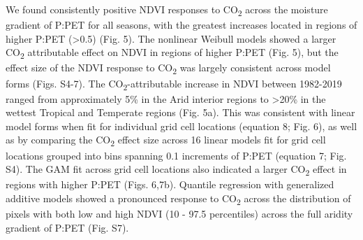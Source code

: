 \documentclass[gc, manuscript]{copernicus}
\begin{document}
We found consistently positive NDVI responses to CO\textsubscript{2}
across the moisture gradient of P:PET for all seasons, with the greatest
increases located in regions of higher P:PET (\textgreater0.5) (Fig. 5).
The nonlinear Weibull models showed a larger CO\textsubscript{2}
attributable effect on NDVI in regions of higher P:PET (Fig. 5), but the
effect size of the NDVI response to CO\textsubscript{2} was largely
consistent across model forms (Figs. S4-7). The
CO\textsubscript{2}-attributable increase in NDVI between 1982-2019
ranged from approximately 5\% in the Arid interior regions to
\textgreater20\% in the wettest Tropical and Temperate regions (Fig.
5a). This was consistent with linear model forms when fit for individual
grid cell locations (equation 8; Fig. 6), as well as by comparing the
CO\textsubscript{2} effect size across 16 linear models fit for grid
cell locations grouped into bins spanning 0.1 increments of P:PET
(equation 7; Fig. S4). The GAM fit across grid cell locations also
indicated a larger CO\textsubscript{2} effect in regions with higher
P:PET (Figs. 6,7b). Quantile regression with generalized additive models
showed a pronounced response to CO\textsubscript{2} across the
distribution of pixels with both low and high NDVI (10 - 97.5
percentiles) across the full aridity gradient of P:PET (Fig. S7).
\end{document}

